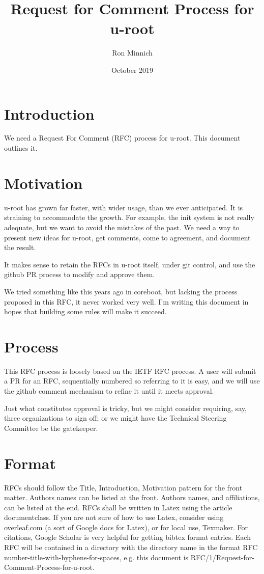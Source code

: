 \documentclass{article}
\title{Request for Comment Process for u-root}
\author{Ron Minnich}
\date{October 2019}
\begin{document}
\maketitle

\section{Introduction}
We need a Request For Comment (RFC) process for u-root. This document outlines it.

\section{Motivation}
u-root has grown far faster, with wider usage, than we ever anticipated.
It is straining to accommodate the growth.
For example, the init system is not really adequate, but we want to avoid the mistakes of the past. 
We need a way to present new ideas for u-root, get comments, come to agreement, and document the result. 

It makes sense to retain the RFCs in u-root itself, under git control, and use the github PR process to modify and approve them.

We tried something like this years ago in coreboot, but lacking the process proposed in this RFC, it never worked very well.
I'm writing this document in hopes that building some rules will make it succeed.

\section{Process}
This RFC process is loosely based on the IETF RFC process\cite{RFC0001}.
A user will submit a PR for an RFC, sequentially numbered so referring to it is easy,
and we will use the github comment mechanism to refine it until it meets approval. 

Just what constitutes approval is tricky, but we might consider requiring, say, three organizations to sign off; or we might have the Technical Steering Committee be the gatekeeper.

\section{Format}
RFCs should follow the Title, Introduction, Motivation pattern for the front matter. 
Authors names can be listed at the front. 
Authors names, and affiliations, can be listed at the end. 
RFCs shall be written in Latex using the article documentclass.
If you are not sure of how to use Latex, consider using overleaf.com (a sort of Google docs for Latex), or for local use, Texmaker.
For citations, Google Scholar is very helpful for getting bibtex format entries.
Each RFC will be contained in a directory with the directory name in the format
RFC number-title-with-hyphens-for-spaces, e.g. this document is
RFC/1/Request-for-Comment-Process-for-u-root.
\end{document}
